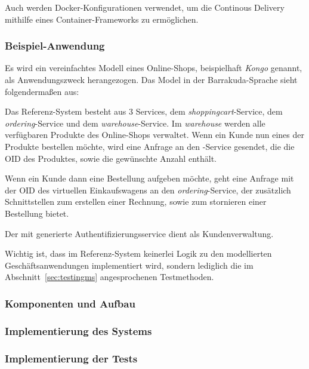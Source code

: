 \documentclass[12pt,a4paper,bibliography=totocnumbered,listof=totocnumbered]{scrartcl}
\begin{document}
Auch werden Docker-Konfigurationen verwendet, um die Continous Delivery mithilfe eines Container-Frameworks zu ermöglichen.

\subsubsection{Beispiel-Anwendung}

Es wird ein vereinfachtes Modell eines Online-Shops, beispielhaft \textit{Kongo} genannt, als Anwendungszweck herangezogen. Das Model in der Barrakuda-Sprache sieht folgendermaßen aus:



Das Referenz-System besteht aus 3 Services, dem \textit{shoppingcart}-Service, dem \textit{ordering}-Service und dem \textit{warehouse}-Service. Im \textit{warehouse} werden alle verfügbaren Produkte des Online-Shops verwaltet. Wenn ein Kunde nun eines der Produkte bestellen möchte, wird eine Anfrage an den -Service gesendet, die die OID des Produktes, sowie die gewünschte Anzahl enthält.

Wenn ein Kunde dann eine Bestellung aufgeben möchte, geht eine Anfrage mit der OID des virtuellen Einkaufswagens an den \textit{ordering}-Service, der zusätzlich Schnittstellen zum erstellen einer Rechnung, sowie zum stornieren einer Bestellung bietet.

Der mit generierte Authentifizierungsservice dient als Kundenverwaltung.


Wichtig ist, dass im Referenz-System keinerlei Logik zu den modellierten Geschäftsanwendungen implementiert wird, sondern lediglich die im Abschnitt~\ref{sec:testingms} angesprochenen Testmethoden.

\subsubsection{Komponenten und Aufbau}

\subsubsection{Implementierung des Systems}

\subsubsection{Implementierung der Tests}
\end{document}
